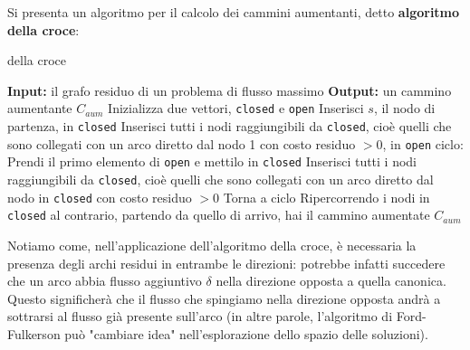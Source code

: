 \documentclass[a4paper,11pt]{article}
\begin{document}
Si presenta un algoritmo per il calcolo dei cammini aumentanti, detto \textbf{algoritmo della croce}:
\begin{algorithm}[H]
\caption{della croce}
\begin{algorithmic}
	\STATE \textbf{Input:} il grafo residuo di un problema di flusso massimo %
	\STATE \textbf{Output:} un cammino aumentante $C_{aum}$ %
	\STATE Inizializza due vettori, \lstinline|closed| e \lstinline|open|
	\STATE Inserisci $s$, il nodo di partenza, in \lstinline|closed|
	\STATE Inserisci tutti i nodi raggiungibili da \lstinline|closed|, cioè quelli che sono collegati con un arco diretto dal nodo 1 con costo residuo $> 0$, in \lstinline|open|
	\STATE \textsf{ciclo:}
	\STATE Prendi il primo elemento di \lstinline|open| e mettilo in \lstinline|closed|
	\STATE Inserisci tutti i nodi raggiungibili da \lstinline|closed|, cioè quelli che sono collegati con un arco diretto dal nodo in \lstinline|closed| con costo residuo $> 0$
		\STATE Torna a \textsf{ciclo}
	\ENDIF
	\STATE Ripercorrendo i nodi in \lstinline|closed| al contrario, partendo da quello di arrivo, hai il cammino aumentate $C_{aum}$
\end{algorithmic}
\end{algorithm}

Notiamo come, nell'applicazione dell'algoritmo della croce, è necessaria la presenza degli archi residui in entrambe le direzioni: potrebbe infatti succedere che un arco abbia flusso aggiuntivo $\delta$ nella direzione opposta a quella canonica.
Questo significherà che il flusso che spingiamo nella direzione opposta andrà a sottrarsi al flusso già presente sull'arco (in altre parole, l'algoritmo di Ford-Fulkerson può "cambiare idea" nell'esplorazione dello spazio delle soluzioni).
\end{document}
